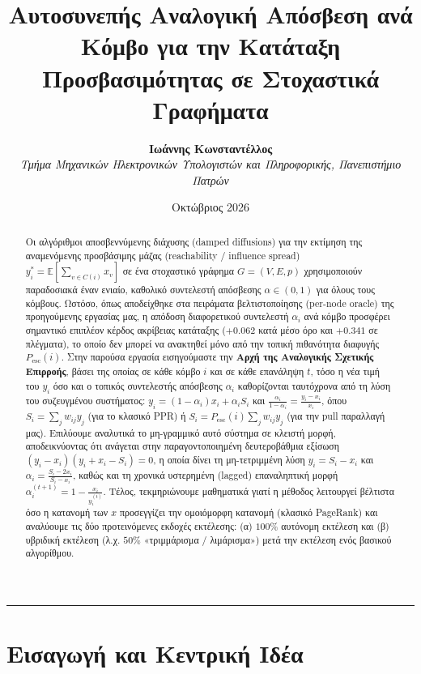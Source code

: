 \documentclass[11pt, a4paper]{article}
\title{\textbf{Αυτοσυνεπής Αναλογική Απόσβεση ανά Κόμβο για την Κατάταξη Προσβασιμότητας σε Στοχαστικά Γραφήματα}}
\author{\textbf{Ιωάννης Κωνσταντέλλος} \\ \textit{Τμήμα Μηχανικών Ηλεκτρονικών Υπολογιστών και Πληροφορικής, Πανεπιστήμιο Πατρών}}
\date{Οκτώβριος 2026}
\begin{document}
\maketitle

\begin{abstract}
Οι αλγόριθμοι αποσβεννύμενης διάχυσης (damped diffusions) για την εκτίμηση της αναμενόμενης προσβάσιμης μάζας (reachability / influence spread) $y^*_i = \mathbb{E}[\sum_{v \in C(i)} x_v]$ σε ένα στοχαστικό γράφημα $G=(V,E,p)$ χρησιμοποιούν παραδοσιακά έναν ενιαίο, καθολικό συντελεστή απόσβεσης $\alpha \in (0,1)$ για όλους τους κόμβους. Ωστόσο, όπως αποδείχθηκε στα πειράματα βελτιστοποίησης (per-node oracle) της προηγούμενης εργασίας μας, η απόδοση διαφορετικού συντελεστή $\alpha_i$ ανά κόμβο προσφέρει σημαντικό επιπλέον κέρδος ακρίβειας κατάταξης ($+0.062$ κατά μέσο όρο και $+0.341$ σε πλέγματα), το οποίο δεν μπορεί να ανακτηθεί μόνο από την τοπική πιθανότητα διαφυγής $P_{\mathrm{esc}}(i)$. Στην παρούσα εργασία εισηγούμαστε την \textbf{Αρχή της Αναλογικής Σχετικής Επιρροής}, βάσει της οποίας σε κάθε κόμβο $i$ και σε κάθε επανάληψη $t$, τόσο η νέα τιμή του $y_i$ όσο και ο τοπικός συντελεστής απόσβεσης $\alpha_i$ καθορίζονται ταυτόχρονα από τη λύση του συζευγμένου συστήματος: $y_i = (1 - \alpha_i)x_i + \alpha_i S_i$ και $\frac{\alpha_i}{1 - \alpha_i} = \frac{y_i - x_i}{x_i}$, όπου $S_i = \sum_j w_{ij} y_j$ (για το κλασικό PPR) ή $S_i = P_{\mathrm{esc}}(i) \sum_j w_{ij} y_j$ (για την pull παραλλαγή μας). Επιλύουμε αναλυτικά το μη-γραμμικό αυτό σύστημα σε κλειστή μορφή, αποδεικνύοντας ότι ανάγεται στην παραγοντοποιημένη δευτεροβάθμια εξίσωση $(y_i - x_i)(y_i + x_i - S_i) = 0$, η οποία δίνει τη μη-τετριμμένη λύση $y_i = S_i - x_i$ και $\alpha_i = \frac{S_i - 2x_i}{S_i - x_i}$, καθώς και τη χρονικά υστερημένη (lagged) επαναληπτική μορφή $\alpha_i^{(t+1)} = 1 - \frac{x_i}{y_i^{(t)}}$. Τέλος, τεκμηριώνουμε μαθηματικά γιατί η μέθοδος λειτουργεί βέλτιστα όσο η κατανομή των $x$ προσεγγίζει την ομοιόμορφη κατανομή (κλασικό PageRank) και αναλύουμε τις δύο προτεινόμενες εκδοχές εκτέλεσης: (α) $100\%$ αυτόνομη εκτέλεση και (β) υβριδική εκτέλεση (λ.χ. $50\%$ «τριμμάρισμα / λιμάρισμα») μετά την εκτέλεση ενός βασικού αλγορίθμου.
\end{abstract}

\vspace{0.3cm}
\hrule
\vspace{0.3cm}

\section{Εισαγωγή και Κεντρική Ιδέα}
\end{document}
